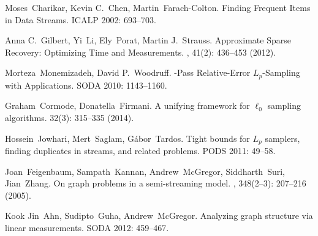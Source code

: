 \documentclass[11pt]{article}
\theoremstyle{definition}
\theoremstyle{remark}
\begin{document}


\begin{thebibliography}{42}

Moses~Charikar, Kevin C.~Chen, Martin~Farach-Colton.
\newblock Finding Frequent Items in Data Streams.
\newblock ICALP 2002: 693--703.

Anna C.~Gilbert, Yi~Li, Ely~Porat, Martin J.~Strauss.
\newblock Approximate Sparse Recovery: Optimizing Time and Measurements.
, 41(2): 436--453 (2012).

Morteza~Monemizadeh, David P.~Woodruff.
-Pass Relative-Error $L_p$-Sampling with Applications.
\newblock SODA 2010: 1143--1160.

Graham~Cormode, Donatella~Firmani.
\newblock A unifying framework for $\ell_0$ sampling algorithms.
 32(3): 315--335 (2014).

Hossein~Jowhari, Mert~Saglam, G\'{a}bor~Tardos.
\newblock Tight bounds for $L_p$ samplers, finding duplicates in streams, and related problems.
\newblock PODS 2011: 49--58.

Joan~Feigenbaum, Sampath~Kannan, Andrew~McGregor, Siddharth~Suri, Jian~Zhang.
\newblock On graph problems in a semi-streaming model.
, 348(2--3): 207--216 (2005).

Kook Jin~Ahn, Sudipto~Guha, Andrew~McGregor.
\newblock Analyzing graph structure via linear measurements.
\newblock SODA 2012: 459--467.

\end{thebibliography}
\end{document}
